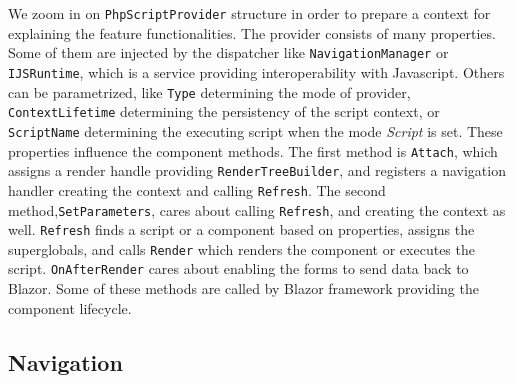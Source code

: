 We zoom in on \texttt{PhpScriptProvider} structure in order to prepare a context for explaining the feature functionalities.
The provider consists of many properties.
Some of them are injected by the dispatcher like \texttt{NavigationManager} or \texttt{IJSRuntime}, which is a service providing interoperability with Javascript.
Others can be parametrized, like \texttt{Type} determining the mode of provider, \texttt{ContextLifetime} determining the persistency of the script context, or \texttt{ScriptName} determining the executing script when the mode \textit{Script} is set.
These properties influence the component methods.
The first method is \texttt{Attach}, which assigns a render handle providing \texttt{RenderTreeBuilder}, and registers a navigation handler creating the context and calling \texttt{Refresh}.
The second method,\texttt{SetParameters}, cares about calling \texttt{Refresh}, and creating the context as well.
\texttt{Refresh} finds a script or a component based on properties, assigns the superglobals, and calls \texttt{Render} which renders the component or executes the script.
\texttt{OnAfterRender} cares about enabling the forms to send data back to Blazor.
Some of these methods are called by Blazor framework providing the component lifecycle.

\subsection{Navigation}

